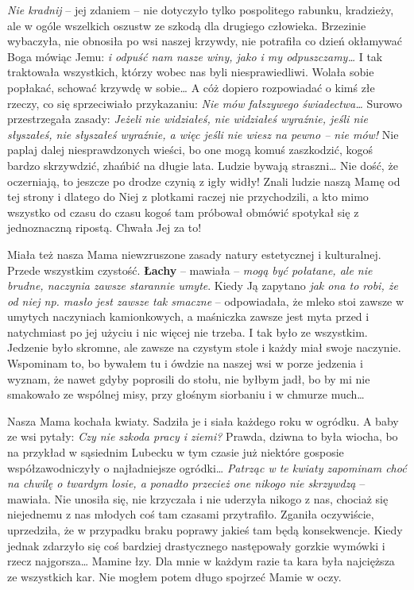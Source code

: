 \textit{Nie kradnij} -- jej zdaniem – nie dotyczyło tylko pospolitego rabunku, kradzieży, ale w ogóle wszelkich oszustw ze szkodą dla drugiego człowieka. Brzezinie wybaczyła, nie obnosiła po wsi naszej krzywdy, nie potrafiła co dzień okłamywać Boga mówiąc Jemu: \textit{i odpuść nam nasze winy, jako i my odpuszczamy…} I tak traktowała wszystkich, którzy wobec nas byli niesprawiedliwi. Wolała sobie popłakać, schować krzywdę w sobie… A cóż dopiero rozpowiadać o kimś złe rzeczy, co się sprzeciwiało przykazaniu: \textit{Nie mów fałszywego świadectwa…} Surowo przestrzegała zasady: \textit{Jeżeli nie widziałeś, nie widziałeś wyraźnie, jeśli nie słyszałeś, nie słyszałeś wyraźnie, a więc jeśli nie wiesz na pewno – nie mów!} Nie paplaj dalej niesprawdzonych wieści, bo one mogą komuś zaszkodzić, kogoś bardzo skrzywdzić, zhańbić na długie lata. Ludzie bywają straszni… Nie dość, że oczerniają, to jeszcze po drodze czynią z igły widły! Znali ludzie naszą Mamę od tej strony i dlatego do Niej z plotkami raczej nie przychodzili, a kto mimo wszystko od czasu do czasu kogoś tam próbował obmówić spotykał się z jednoznaczną ripostą. Chwała Jej za to!

Miała też nasza Mama niewzruszone zasady natury estetycznej i kulturalnej. Przede wszystkim czystość. \textbf{Łachy} – mawiała – \textit{mogą być połatane, ale nie brudne, naczynia zawsze starannie umyte}. Kiedy Ją zapytano \textit{jak ona to robi, że od niej np. masło jest zawsze tak smaczne} – odpowiadała, że mleko stoi zawsze w umytych naczyniach kamionkowych, a maśniczka zawsze jest myta przed i natychmiast po jej użyciu i nic więcej nie trzeba. I tak było ze wszystkim. Jedzenie było skromne, ale zawsze na czystym stole i każdy miał swoje naczynie. Wspominam to, bo bywałem tu i ówdzie na naszej wsi w porze jedzenia i wyznam, że nawet gdyby poprosili do stołu, nie byłbym jadł, bo by mi nie smakowało ze wspólnej misy, przy głośnym siorbaniu i w chmurze much…

Nasza Mama kochała kwiaty. Sadziła je i siała każdego roku w ogródku. A baby ze wsi pytały: \textit{Czy nie szkoda pracy i ziemi?} Prawda, dziwna to była wiocha, bo na przykład w sąsiednim Lubecku w tym czasie już niektóre gosposie współzawodniczyły o najładniejsze ogródki…\textit{ Patrząc w te kwiaty zapominam choć na chwilę o twardym losie, a ponadto przecież one nikogo nie skrzywdzą} – mawiała. Nie unosiła się, nie krzyczała i nie uderzyła nikogo z nas, chociaż się niejednemu z nas młodych coś tam czasami przytrafiło. Zganiła oczywiście, uprzedziła, że w przypadku braku poprawy jakieś tam będą konsekwencje. Kiedy jednak zdarzyło się coś bardziej drastycznego następowały gorzkie wymówki i rzecz najgorsza… Mamine łzy. Dla mnie w każdym razie ta kara była najcięższa ze wszystkich kar. Nie mogłem potem długo spojrzeć Mamie w oczy.

